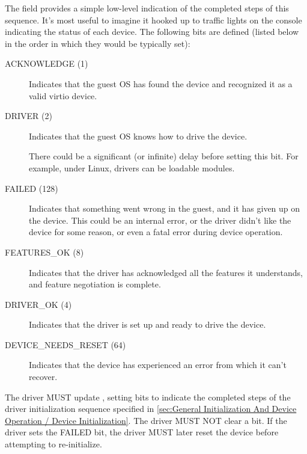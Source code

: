 The  field provides a simple low-level
indication of the completed steps of this sequence.
It's most useful to imagine it hooked up to traffic
lights on the console indicating the status of each device.  The
following bits are defined (listed below in the order in which
they would be typically set):
\begin{description}
\item[ACKNOWLEDGE (1)] Indicates that the guest OS has found the
  device and recognized it as a valid virtio device.

\item[DRIVER (2)] Indicates that the guest OS knows how to drive the
  device.
  \begin{note}
    There could be a significant (or infinite) delay before setting
    this bit.  For example, under Linux, drivers can be loadable modules.
  \end{note}

\item[FAILED (128)] Indicates that something went wrong in the guest,
  and it has given up on the device. This could be an internal
  error, or the driver didn't like the device for some reason, or
  even a fatal error during device operation.

\item[FEATURES_OK (8)] Indicates that the driver has acknowledged all the
  features it understands, and feature negotiation is complete.

\item[DRIVER_OK (4)] Indicates that the driver is set up and ready to
  drive the device.

\item[DEVICE_NEEDS_RESET (64)] Indicates that the device has experienced
  an error from which it can't recover.
\end{description}

The driver MUST update ,
setting bits to indicate the completed steps of the driver
initialization sequence specified in
\ref{sec:General Initialization And Device Operation / Device
Initialization}.
The driver MUST NOT clear a
 bit.  If the driver sets the FAILED bit,
the driver MUST later reset the device before attempting to re-initialize.

